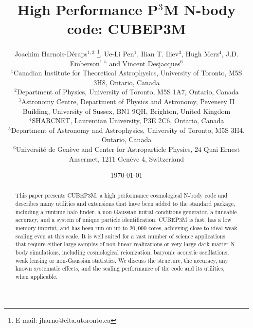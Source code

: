 \documentclass[useAMS,usenatbib]{mn2e}
\title[{\small}  High Performance P$^{3}$M N-body code: CUBEP3M]{{\small} High Performance P$^{3}$M N-body code: CUBEP3M}
\author[Joachim Harnois-D\'{e}raps, Ue-Li Pen, Ilian T. Iliev, Hugh Merz, JD Emberson, Vincent Desjacques]{Joachim Harnois-D\'{e}raps$^{1,2}$ 
\thanks{E-mail: jharno@cita.utoronto.ca},  Ue-Li Pen$^{1}$, 
Ilian T. Iliev$^{3}$, Hugh Merz$^{4}$, \newauthor
J.D. Emberson$^{1,5}$ and Vincent Desjacques$^{6}$\\
$^{1}$Canadian Institute for Theoretical Astrophysics, University of
Toronto, M5S 3H8, Ontario, Canada\\
$^{2}$Department of Physics, University of Toronto, M5S 1A7, Ontario,  Canada\\
$^{3}$Astronomy Centre, Department of Physics and Astronomy, Pevensey II Building, University of Sussex, BN1 9QH, Brighton, United Kingdom\\
$^{4}$SHARCNET, Laurentian University, P3E 2C6, Ontario, Canada\\
$^{5}$Department of Astronomy and Astrophysics, University of Toronto, M5S 3H4, Ontario, Canada\\
$^{6}$Universit\'{e} de Gen\`{e}ve and Center for Astroparticle Physics, 24 Quai Ernest Ansermet, 1211 Gen\`{e}ve 4, Switzerland}
\begin{document}
\date{\today}

\pagerange{\pageref{firstpage}--\pageref{lastpage}} 

\maketitle

\label{firstpage}

\begin{abstract}
This paper presents {\small CUBEP3M}, a high performance cosmological N-body code
and describes many utilities and extensions that have been added to the standard package, including a runtime halo finder,
a non-Gaussian initial conditions generator, a tuneable accuracy, and a system of unique particle identification.
{\small CUBEP3M} is fast, has a low memory imprint, and 
has been run on up to $20,000$ cores, achieving close to ideal weak scaling
even at this scale.
It is well suited for a vast number of science applications that 
require either large samples of non-linear realizations or 
very large dark matter N-body simulations,
including  cosmological reionization, baryonic acoustic oscillations, weak lensing or
non-Gaussian statistics.
We discuss the structure, the accuracy, any known systematic effects, and the scaling performance
of the code and its utilities, when applicable.
\end{abstract}
\end{document}
